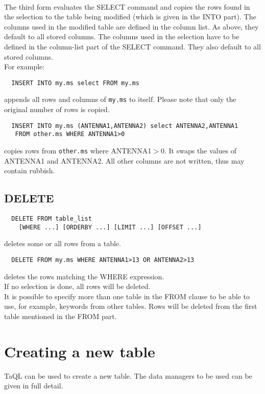\paragraph*{}
The third form evaluates the SELECT command and copies the rows
found in the selection to the table being modified (which is given
in the INTO part).
The columns used in the modified table are defined in the column list.
As above, they default to all stored columns. The columns used in the
selection have to be defined in the column-list part of the SELECT command.
They also default to all stored columns.
\\For example:
\begin{verbatim}
  INSERT INTO my.ms select FROM my.ms
\end{verbatim}
appends all rows and columns of \texttt{my.ms} to itself.
Please note that only the original number of rows is copied.
\begin{verbatim}
  INSERT INTO my.ms (ANTENNA1,ANTENNA2) select ANTENNA2,ANTENNA1
   FROM other.ms WHERE ANTENNA1>0
\end{verbatim}
copies rows from \texttt{other.ms} where ANTENNA1$>$0. It swaps the
values of ANTENNA1 and ANTENNA2. All other columns are not written,
thus may contain rubbish.

\subsection{DELETE}
\begin{verbatim}
  DELETE FROM table_list
    [WHERE ...] [ORDERBY ...] [LIMIT ...] [OFFSET ...]
\end{verbatim}
deletes some or all rows from a table.
\begin{verbatim}
  DELETE FROM my.ms WHERE ANTENNA1>13 OR ANTENNA2>13
\end{verbatim}
deletes the rows matching the WHERE expression.
\\If no selection is done, all rows will be deleted.
\\It is possible to specify more than one table in the FROM clause to
be able to use, for example, keywords from other tables.
Rows will be deleted from the first table mentioned in the FROM part.

\section{\label{TAQL:CREATETABLE}Creating a new table}
TaQL can be used to create a new table. The data managers to be used
can be given in full detail.

